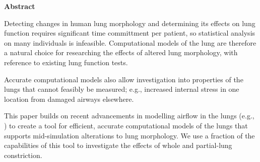 %

{\Large \textbf{Abstract}}

\vspace{0.5cm}

Detecting changes in human lung morphology and determining its effects on lung function requires
significant time committment per patient, so statistical analysis on many individuals is infeasible.
Computational models of the lung are therefore a natural choice for researching the effects of
altered lung morphology, with reference to existing lung function tests.

Accurate computational models also allow investigation into properties of the lungs that cannot
feasibly be measured; e.g., increased internal stress in one location from damaged airways
elsewhere.

This paper builds on recent advancements in modelling airflow in the lungs (e.g.,
\cite{FoyEtAl2017}) to create a tool for efficient, accurate computational models of the lungs that
supports mid-simulation alterations to lung morphology. We use a fraction of the capabilities of
this tool to investigate the effects of whole and partial-lung constriction.

